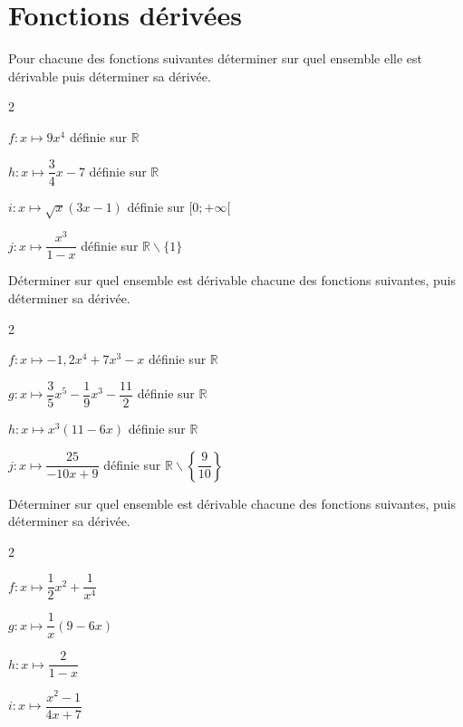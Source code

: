 \documentclass[11pt,a4paper]{article}  %
\begin{document}
\section*{Fonctions dérivées}

\exercice{}

Pour chacune des fonctions suivantes déterminer sur quel ensemble elle est dérivable puis déterminer sa dérivée.
\begin{multicols}{2}
\begin{enumMet}
	\item $f: x \mapsto 9 x^4$ définie sur $\mathbb{R}$
	\item $h: x \mapsto \dfrac{3}{4} x-7$ définie sur $\mathbb{R}$
	\item  $i: x \mapsto \sqrt{x}(3 x-1)$ définie sur $[0 ;+\infty[$
	\item $j: x \mapsto \dfrac{x^3}{1-x}$ définie sur $\mathbb{R} \backslash\{1\}$
\end{enumMet}
\end{multicols}

\exercice{}

Déterminer sur quel ensemble est dérivable chacune des fonctions suivantes, puis déterminer sa dérivée.
\begin{multicols}{2}
	\begin{enumMet}
		\item $f: x \mapsto-1,2 x^4+7 x^3-x$ définie sur $\mathbb{R}$
		\item $g: x \mapsto \dfrac{3}{5} x^5-\dfrac{1}{9} x^3-\dfrac{11}{2}$ définie sur $\mathbb{R}$
		\item $h: x \mapsto x^3(11-6 x)$ définie sur $\mathbb{R}$
		\item $j: x \mapsto \dfrac{25}{-10 x+9}$ définie sur $\mathbb{R} \backslash\left\{\dfrac{9}{10}\right\}$
	\end{enumMet}
\end{multicols}

\exercice{}

Déterminer sur quel ensemble est dérivable chacune des fonctions suivantes, puis déterminer sa dérivée.
\begin{multicols}{2}
	\begin{enumMet}
		\item $f: x \mapsto \dfrac{1}{2} x^2+\dfrac{1}{x^4}$
		\item $g: x \mapsto \dfrac{1}{x}(9-6 x)$
		\item $h: x \mapsto \dfrac{2}{1-x}$
		\item $i: x \mapsto \dfrac{x^2-1}{4 x+7}$
	\end{enumMet}
\end{multicols}
\end{document}
